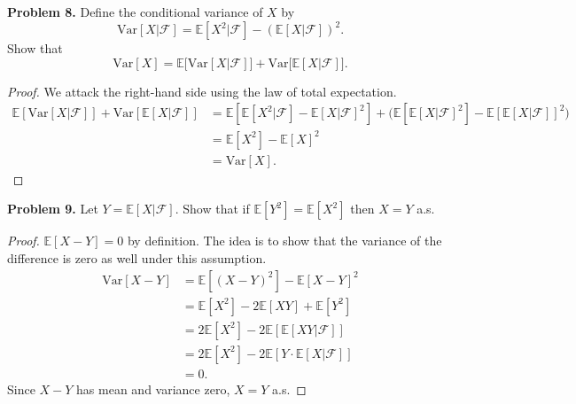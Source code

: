 \documentclass[11pt,letterpaper]{report}
\newcommand{\mcal}[1]{\mathcal{#1}}
\newcommand{\E}{\mathbb{E}}
\newcommand{\Var}{\text{Var}}
\begin{document}
\noindent\textbf{Problem 8. }
Define the conditional variance of $X$ by
\[
\Var[X|\mcal{F}] = \E[X^2|\mcal{F}] - (\E[X|\mcal{F}])^2.
\]
Show that
\[
\Var[X] = \E\big[ \Var[X|\mcal{F}]\big] + \Var\big[ \E[X|\mcal{F}]\big].
\]
\begin{proof}
	We attack the right-hand side using the law of total expectation.
	\begin{align*}
		\E[\Var[X|\mcal{F}]] + \Var[\E[X|\mcal{F}]] &= \E[\E[X^2|\mcal{F}] - \E[X|\mcal{F}]^2] + \bigg( \E[\E[X|\mcal{F}]^2] - \E[\E[X|\mcal{F}]]^2\bigg)\\
		&= \E[X^2] - \E[X]^2\\
		&= \Var[X].
	\end{align*}
\end{proof}

\noindent\textbf{Problem 9. }
Let $Y = \E[X|\mcal{F}]$. Show that if $\E[Y^2] = \E[X^2]$ then $X = Y$ a.s.
\begin{proof}
	$\E[X -Y] = 0$ by definition. The idea is to show that the variance of the difference is zero as well under this assumption.
	\begin{align*}
		\Var[X - Y] &= \E[(X-Y)^2] - \E[X-Y]^2\\
		&= \E[X^2] - 2\E[XY] + \E[Y^2]\\
		&= 2\E[X^2] - 2\E[\E[XY|\mcal{F}]]\\
		&= 2\E[X^2]-2\E[Y\cdot \E[X|\mcal{F}]]\\
		&= 0.
	\end{align*}
	Since $X-Y$ has mean and variance zero, $X=Y$ a.s.
\end{proof}
\end{document}
